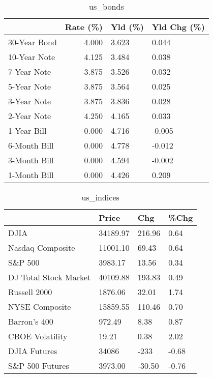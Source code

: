 \documentclass{article}%
\begin{document}
%


\begin{table}[htbp]%
\caption{us\_bonds}%
\centering%
\begin{adjustbox}{width=1\textwidth}%
\begin{tabular}{lrll}
\toprule
             &  Rate (\%) & Yld (\%) & Yld Chg (\%) \\
\midrule
30-Year Bond &     4.000 &   3.623 &       0.044 \\
10-Year Note &     4.125 &   3.484 &       0.038 \\
 7-Year Note &     3.875 &   3.526 &       0.032 \\
 5-Year Note &     3.875 &   3.564 &       0.025 \\
 3-Year Note &     3.875 &   3.836 &       0.028 \\
 2-Year Note &     4.250 &   4.165 &       0.033 \\
 1-Year Bill &     0.000 &   4.716 &      -0.005 \\
6-Month Bill &     0.000 &   4.778 &      -0.012 \\
3-Month Bill &     0.000 &   4.594 &      -0.002 \\
1-Month Bill &     0.000 &   4.426 &       0.209 \\
\bottomrule
\end{tabular}
%
\end{adjustbox}%
\end{table}

%


\begin{table}[htbp]%
\caption{us\_indices}%
\centering%
\begin{adjustbox}{width=1\textwidth}%
\begin{tabular}{llll}
\toprule
                      &    Price &    Chg &  \%Chg \\
\midrule
                 DJIA & 34189.97 & 216.96 &  0.64 \\
     Nasdaq Composite & 11001.10 &  69.43 &  0.64 \\
              S\&P 500 &  3983.17 &  13.56 &  0.34 \\
DJ Total Stock Market & 40109.88 & 193.83 &  0.49 \\
         Russell 2000 &  1876.06 &  32.01 &  1.74 \\
       NYSE Composite & 15859.55 & 110.46 &  0.70 \\
         Barron's 400 &   972.49 &   8.38 &  0.87 \\
      CBOE Volatility &    19.21 &   0.38 &  2.02 \\
         DJIA Futures &    34086 &   -233 & -0.68 \\
      S\&P 500 Futures &  3973.00 & -30.50 & -0.76 \\
\bottomrule
\end{tabular}
%
\end{adjustbox}%
\end{table}
\end{document}
